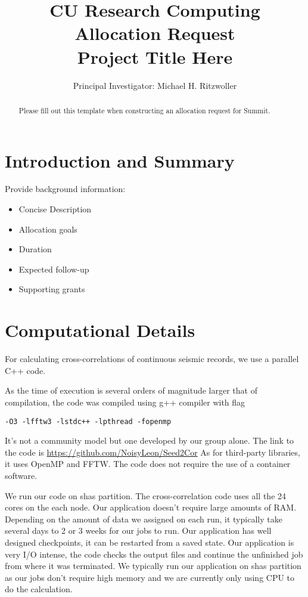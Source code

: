 \documentclass[11pt, oneside]{article}
\title{%
\bf{CU Research Computing Allocation Request} \\
\Large Project Title Here
}
\author{Principal Investigator:  Michael H. Ritzwoller}
\date{}							%
\begin{document}
\maketitle
\begin{abstract}
    Please fill out this template when constructing an allocation request for Summit.
\end{abstract}

\section{Introduction and Summary}

Provide background information:
\begin{itemize}
\item Concise Description
\item Allocation goals
\item Duration
\item Expected follow-up
\item Supporting grants
\end{itemize}


\section{Computational Details}

For calculating cross-correlations of continuous seismic records,
we use a parallel C++ code.

As the time of execution is several orders of magnitude
larger that of compilation,
the code was compiled using g++ compiler
with flag
\begin{lstlisting}
-O3 -lfftw3 -lstdc++ -lpthread -fopenmp
\end{lstlisting}

It's not a community model but one developed by our group alone.
The link to the code is \url{https://github.com/NoisyLeon/Seed2Cor}
As for third-party libraries, it uses OpenMP and FFTW.
The code does not require the use of a container software.

We run our code on shas partition.
The cross-correlation code uses all the 24 cores on the each node.
Our application doesn't require large amounts of RAM.
Depending on the amount of data we assigned on each run,
it typically take several days to 2 or 3 weeks for our jobs to run.
Our application has well designed checkpoints,
it can be restarted from a saved state.
Our application is very I/O intense,
the code checks the output files and
continue the unfinished job from where it was terminated.
We typically run our application on shas partition
as our jobs don't require high memory and
we are currently only using CPU to do the calculation.
\end{document}
